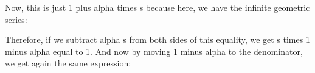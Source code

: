 \documentclass[pdftex, brazil, 12pt, twoside]{article}
\begin{document}
\begin{figure}[H]
  \begin{center}
  \end{center}
\end{figure}

Now, this is just 1 plus alpha times s because here, we have
the infinite geometric series:

\begin{figure}[H]
  \begin{center}
  \end{center}
\end{figure}

Therefore, if we subtract alpha s from both sides of
this equality, we get s times 1 minus alpha equal to 1.
And now by moving 1 minus alpha to the denominator, we
get again the same expression:

\begin{figure}[H]
  \begin{center}
  \end{center}
\end{figure}
\end{document}
